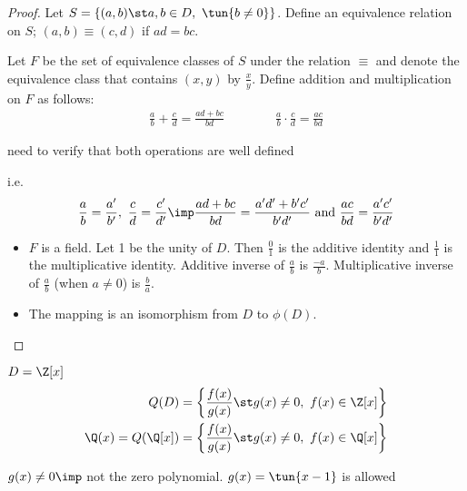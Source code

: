 \documentclass[a4paper]{article}
\begin{document}
\begin{proof}
  Let \( S = \{(a,b) \st a,b\in D,\ \tun{b\neq 0}\} \). Define an equivalence relation on \( S \); \( (a,b) \equiv (c,d) \) if \( ad = bc \).

  Let \( F \) be the set of equivalence classes of \( S \) under the relation \( \equiv \) and denote the equivalence class that contains \( (x,y) \) by \( \frac{x}{y} \). Define addition and multiplication on \( F \) as follows:
  \begin{align*}
    \frac{a}{b} + \frac{c}{d} = \frac{ad+bc}{bd} \qquad\qquad \frac{a}{b} \cdot \frac{c}{d} = \frac{ac}{bd}
  \end{align*}
  \begin{exercise}
    need to verify that both operations are well defined
  \end{exercise}
  i.e. \begin{align*}
    \frac{a}{b}=\frac{a'}{b'},\ \frac{c}{d} = \frac{c'}{d'} \imp \frac{ad+bc}{bd} = \frac{a'd'+b'c'}{b'd'} \text{ and } \frac{ac}{bd}=\frac{a'c'}{b'd'}
  \end{align*}
  \begin{itemize}
    \item \( F \) is a field. Let 1 be the unity of \( D \). Then \( \frac{0}{1} \) is the additive identity and \( \frac{1}{1} \) is the multiplicative identity. Additive inverse of \( \frac{a}{b} \) is \( \frac{-a}{b} \). Multiplicative inverse of \( \frac{a}{b} \) (when \( a\neq 0 \)) is \( \frac{b}{a} \).
    \item The mapping  is an isomorphism from \( D \) to \( \phi(D) \).
  \end{itemize}
\end{proof}

\begin{example}
  \( D=\Z[x] \)
\begin{align*}
  Q(D) &= \left\{\frac{f(x)}{g(x)}\st g(x)\neq 0,\ f(x)\in\Z[x]\right\} \\
  \Q(x) = Q(\Q[x]) &= \left\{\frac{f(x)}{g(x)}\st g(x)\neq 0,\ f(x)\in\Q[x]\right\}
\end{align*}
\begin{note}
  \( g(x)\neq 0 \imp \) not the zero polynomial. \( g(x) = \tun{x-1} \) is allowed
\end{note}
\end{example}
\end{document}
